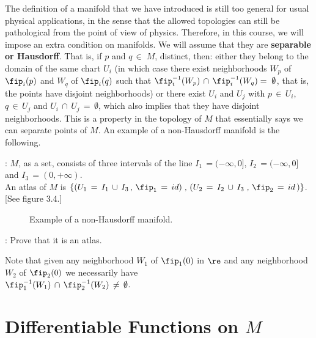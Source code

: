 The definition of a manifold that we have introduced is still too general for usual physical applications, in the sense that the allowed topologies can still be pathological from the point of view of physics. Therefore, in this course, we will impose an extra condition on manifolds.
We will assume that they are {\bf separable or Hausdorff}. That is, if $p$ and $q\,\in\;M$, distinct, then: either they belong to the domain of the same chart $U_i$ (in which case there exist neighborhoods $W_p$ of $\fip_i(p)$ and $W_q$ of $\fip_i(q)$ such that $\fip_i^{-1}(W_p)\,\cap\,\fip_i^{-1}(W_q)=\;\emptyset$, that is, the points have disjoint neighborhoods) or there exist $U_i$ and $U_j$ with $p\,\in\,U_i$, $q\,\in\,U_j$ and $U_i\,\cap\,U_j\,=\,\emptyset$, which also implies that they have disjoint neighborhoods.
This is a property in the topology of $M$ that essentially says we can separate points of $M$. An example of a non-Hausdorff manifold is the following.

\ejem: $M$, as a set, consists of three intervals of the line $I_1\,=(-\infty,0]$, $I_2\,=(-\infty,0]$ and $I_3\,=(0,+\infty)$. \\
An atlas of $M$ is $\{ ( U_1\,=\,I_1\,\cup\,I_3\,,\,\fip_1\,=\,id)\;,\,(U_2\,=\,I_2\,\cup\, I_3\;,\,\fip_2\,=\,id\,)\}$. 
[See figure 3.4.] 

\espa 

\begin{figure}[htbp]
  \begin{center}
    \caption{Example of a non-Hausdorff manifold.}
    \label{fig:3_4}
  \end{center}
\end{figure}

\ejer: Prove that it is an atlas.

\noi Note that given any neighborhood $W_1$ of $\fip_1(0)$ in $\re$ and any neighborhood $W_2$ of $\fip_2(0)$ we necessarily have \hfill \\
$\fip_1^{-1}(W_1)\,\cap\,\fip_2^{-1}(W_2)\,\neq \,\emptyset$.


\section {Differentiable Functions on $M$}


